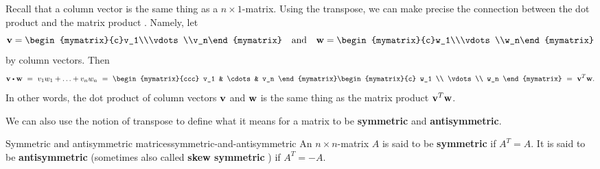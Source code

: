 Recall that a column vector is the same thing as a $n\times
1$-matrix. Using the transpose, we can make precise the connection
between the dot product and the matrix product%
%
. Namely, let
\begin{equation*}
  \vect{v}=\begin{mymatrix}{c}v_1\\\vdots\\v_n\end{mymatrix}
  \quad\mbox{and}\quad
  \vect{w}=\begin{mymatrix}{c}w_1\\\vdots\\w_n\end{mymatrix}
\end{equation*}
by column vectors. Then
\begin{equation*}
  \vect{v}\dotprod\vect{w}
  ~=~
  v_1w_1 + \ldots + v_nw_n
  ~=~
  \begin{mymatrix}{ccc} v_1 & \cdots & v_n \end{mymatrix}
  \begin{mymatrix}{c} w_1 \\ \vdots \\ w_n \end{mymatrix}
  ~=~
  \vect{v}^{T}\vect{w}.
\end{equation*}
In other words, the dot product of column vectors $\mbox{\bf v}$ and
$\mbox{\bf w}$ is the same thing as the matrix product
$\mbox{\bf v}^{T}\mbox{\bf w}$.

We can also use the notion of transpose to define what it means for a
matrix to be \textbf{symmetric} and \textbf{antisymmetric}.

\begin{definition}{Symmetric and antisymmetric matrices}{symmetric-and-antisymmetric}
  An $n\times n$-matrix $A$ is said to be \textbf{symmetric}%
   if $A^{T}=A$. It is
  said to be \textbf{antisymmetric}%
   (sometimes
  also called \textbf{skew symmetric}%
  ) if
  $A^{T}=-A$.
\end{definition}

